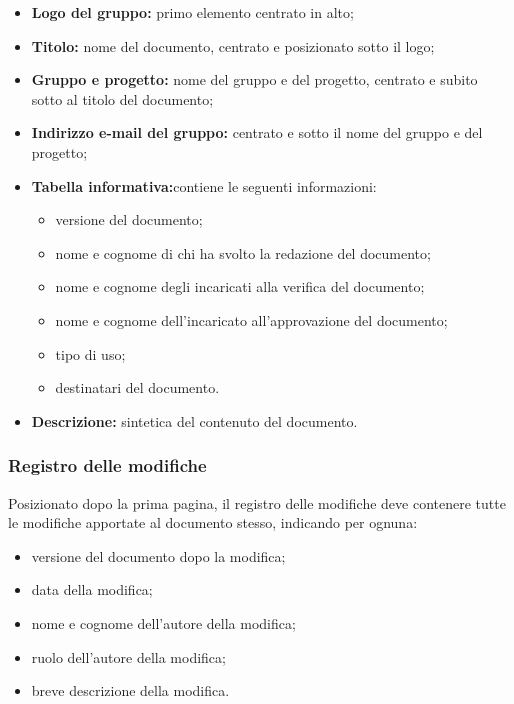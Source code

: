 \documentclass[../NormediProgetto.tex]{subfiles}
\begin{document}
\begin{itemize}
    \item{\textbf{Logo del gruppo:}} primo elemento centrato in alto; 
    \item{\textbf{Titolo:}} nome del documento, centrato e posizionato sotto il logo; 
    \item{\textbf{Gruppo e progetto:}} nome del gruppo e del progetto, centrato e subito sotto al titolo del documento; 
    \item{\textbf{Indirizzo e-mail del gruppo:}} centrato e sotto il nome del gruppo e del progetto; 
    \item{\textbf{Tabella informativa:}}contiene le seguenti informazioni: 
    \begin{itemize} 
        \item versione del documento;
        \item nome e cognome di chi ha svolto la redazione del documento; 
        \item nome e cognome degli incaricati alla verifica del documento; 
        \item nome e cognome dell'incaricato all’approvazione del documento;
        \item tipo di uso; 
        \item  destinatari del documento.
        \end{itemize}
    \item {\textbf{Descrizione:}} sintetica del contenuto del documento.
\end{itemize}

\subsubsection{Registro delle modifiche}

Posizionato dopo la prima pagina, il registro delle modifiche deve contenere tutte le modifiche apportate al documento stesso, indicando per ognuna:

\begin{itemize}
\item versione del documento dopo la modifica;
\item data della modifica;
\item nome e cognome dell'autore della modifica;
\item ruolo dell'autore della modifica;
\item breve descrizione della modifica.
\end{itemize}
\end{document}
